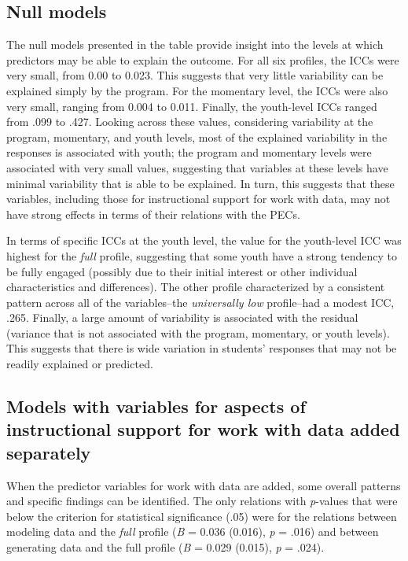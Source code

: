 \documentclass[]{book}
\theoremstyle{definition}
\theoremstyle{definition}
\theoremstyle{definition}
\theoremstyle{remark}
\begin{document}
\subsection{Null models}\label{null-models}

The null models presented in the table provide insight into the levels
at which predictors may be able to explain the outcome. For all six
profiles, the ICCs were very small, from 0.00 to 0.023. This suggests
that very little variability can be explained simply by the program. For
the momentary level, the ICCs were also very small, ranging from 0.004
to 0.011. Finally, the youth-level ICCs ranged from .099 to .427.
Looking across these values, considering variability at the program,
momentary, and youth levels, most of the explained variability in the
responses is associated with youth; the program and momentary levels
were associated with very small values, suggesting that variables at
these levels have minimal variability that is able to be explained. In
turn, this suggests that these variables, including those for
instructional support for work with data, may not have strong effects in
terms of their relations with the PECs.

In terms of specific ICCs at the youth level, the value for the
youth-level ICC was highest for the \emph{full} profile, suggesting that
some youth have a strong tendency to be fully engaged (possibly due to
their initial interest or other individual characteristics and
differences). The other profile characterized by a consistent pattern
across all of the variables--the \emph{universally low} profile--had a
modest ICC, .265. Finally, a large amount of variability is associated
with the residual (variance that is not associated with the program,
momentary, or youth levels). This suggests that there is wide variation
in students' responses that may not be readily explained or predicted.

\subsection{Models with variables for aspects of instructional support
for work with data added
separately}\label{models-with-variables-for-aspects-of-instructional-support-for-work-with-data-added-separately}

When the predictor variables for work with data are added, some overall
patterns and specific findings can be identified. The only relations
with \emph{p}-values that were below the criterion for statistical
significance (.05) were for the relations between modeling data and the
\emph{full} profile (\emph{B} = 0.036 (0.016), \emph{p} = .016) and
between generating data and the full profile (\emph{B} = 0.029 (0.015),
\emph{p} = .024).
\end{document}
